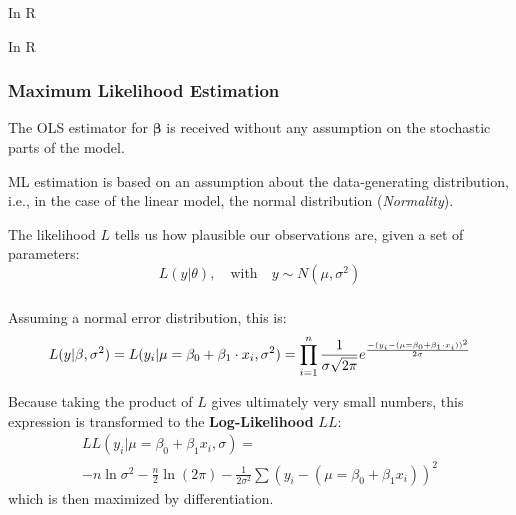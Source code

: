 \documentclass{beamer}
\begin{document}
\begin{frame}{In R}
    \scalebox{0.75}{
      
      }
\end{frame}

\begin{frame}{In R}
    \scalebox{0.7}{
      
      }    
\end{frame}

\begin{frame}
    \frametitle{Maximum Likelihood Estimation}
    The OLS estimator for $\mathbf{{\beta}}$ is received without any assumption on the stochastic parts of the model.
    
    ML estimation is based on an assumption about the data-generating distribution, i.e., in the case of the linear model, the normal distribution (\textit{Normality}).
    
    The likelihood $L$ tells us how plausible our observations are, given a set of parameters:
    \begin{equation*}
        L(y | \theta), \quad \text{with} \quad y \sim N(\mu, \sigma^2)
    \end{equation*}
\end{frame}

\begin{frame}
    \frametitle{}
    Assuming a normal error distribution, this is:
    \begin{equation*}
        \scriptsize{L( y | \beta, \sigma^2) = L(y_i|\mu = \beta_0 + \beta_1 \cdot x_i, \sigma^2) = \prod_{i=1}^n \frac{1}{\sigma \sqrt{2 \pi}} e^\frac{-(y_i - (\mu = \beta_0 + \beta_1 \cdot x_i))^2}{2 \sigma}}
    \end{equation*}
    \vspace{0.5cm}
    
    Because taking the product of $L$ gives ultimately very small numbers, this expression is transformed to the \textbf{Log-Likelihood} $LL$:
    \begin{multline*}
        LL(y_i | \mu = \beta_0 + \beta_1 x_i, \sigma) = \\
        -n \ln \sigma^2 - \frac n2 \ln (2 \pi) - \frac{1}{2 \sigma^2} \sum (y_i - (\mu = \beta_0 + \beta_1 x_i))^2    
    \end{multline*}
    which is then maximized by differentiation.
\end{frame}
\end{document}
